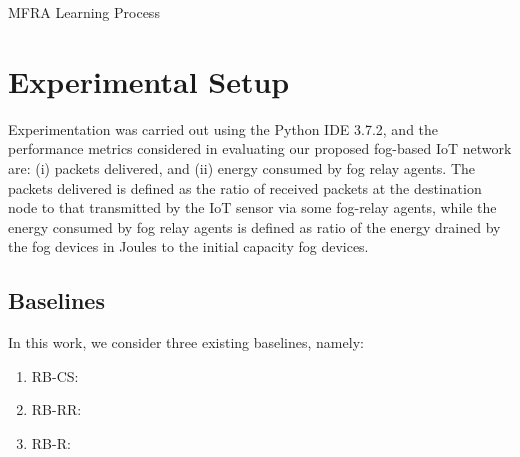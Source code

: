 \documentclass[journal]{IEEEtran}
\makeatletter
\def\BState{\State\hskip-\ALG@thistlm}
\makeatother
\begin{document}
\begin{algorithm}
\caption{MFRA Learning Process}\label{fiotRL}
\end{algorithm}



\section{Experimental Setup}
Experimentation was carried out using the Python IDE 3.7.2, and the performance metrics considered in evaluating our proposed fog-based IoT network are: (i) packets delivered, and (ii) energy consumed by fog relay agents. The packets delivered is defined as the ratio of received packets at the destination node to that transmitted by the IoT sensor via some fog-relay agents, while the energy consumed by fog relay agents is defined as ratio of the energy drained by the fog devices in Joules to the initial capacity fog devices.

\subsection{Baselines}
In this work, we consider three existing baselines, namely:
\begin{enumerate}
  \item RB-CS:
  \item RB-RR:
  \item RB-R:
\end{enumerate}
\end{document}
